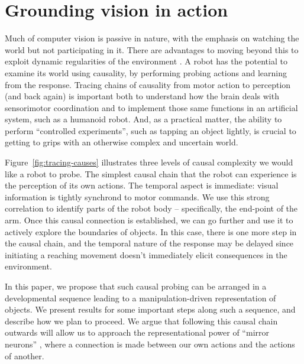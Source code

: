 \section{Grounding vision in action}

Much of computer vision is passive in nature, with the emphasis on
watching the world but not participating in it.  There are advantages
to moving beyond this to exploit dynamic regularities of the
environment \cite{ballard91animate}.
A robot has the
potential to examine its world using causality, by performing probing
actions and learning from the response.  Tracing chains of causality
from motor action to perception (and back again) is important both to
understand how the brain deals with sensorimotor coordination and to
implement those same functions in an artificial system, such as a
humanoid robot.  And, as a practical matter, the ability to perform
``controlled experiments'', such as tapping an object lightly, is
crucial to getting to grips with an otherwise complex and uncertain
world.

Figure~\ref{fig:tracing-causes} illustrates three levels of causal complexity
we would like a robot to probe.
The simplest causal chain that the robot can experience is the
perception of its own actions.  The temporal aspect is immediate:
visual information is tightly synchron\ize{}d to motor commands.
We use this strong correlation to identify parts of the robot
body -- specifically, the end-point of the arm. 
%
Once this causal connection is established, we can go further and use
it to actively explore the boundaries of objects.  In this case, there
is one more step in the causal chain, and the temporal nature of
the response may be delayed since initiating a reaching movement doesn't
immediately elicit consequences in the environment.  


In this paper, we propose that such causal probing can be arranged in
a developmental sequence leading to a manipulation-driven
representation of objects.  We present results for some important
steps along such a sequence, and describe how we plan to proceed.  We
argue that following this causal chain outwards will allow us to
approach the representational power of ``mirror neurons''
\cite{gallese-fadiga-fogassi-rizzolatti-1996}, where a connection 
is made between our own actions and the actions of another.  


